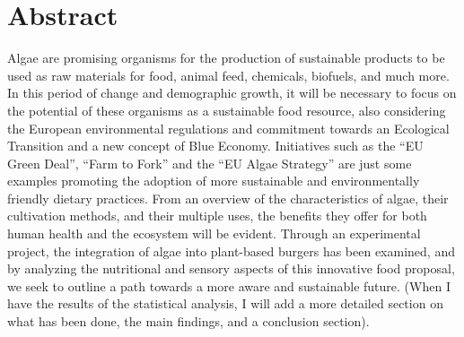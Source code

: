 
\section*{Abstract}
Algae are promising organisms for the production of sustainable products to be used as raw materials for food, animal feed, chemicals, biofuels, and much more. In this period of change and demographic growth, it will be necessary to focus on the potential of these organisms as a sustainable food resource, also considering the European environmental regulations and commitment towards an Ecological Transition and a new concept of Blue Economy.
Initiatives such as the “EU Green Deal”, “Farm to Fork” and the “EU Algae Strategy” are just some examples promoting the adoption of more sustainable and environmentally friendly dietary practices. %
From an overview of the characteristics of algae, their cultivation methods, and their multiple uses, the benefits they offer for both human health and the ecosystem will be evident. Through an experimental project, the integration of algae into plant-based burgers has been examined, and by analyzing the nutritional and sensory aspects of this innovative food proposal, we seek to outline a path towards a more aware and sustainable future.
(When I have the results of the statistical analysis, I will add a more detailed section on what has been done, the main findings, and a conclusion section).

